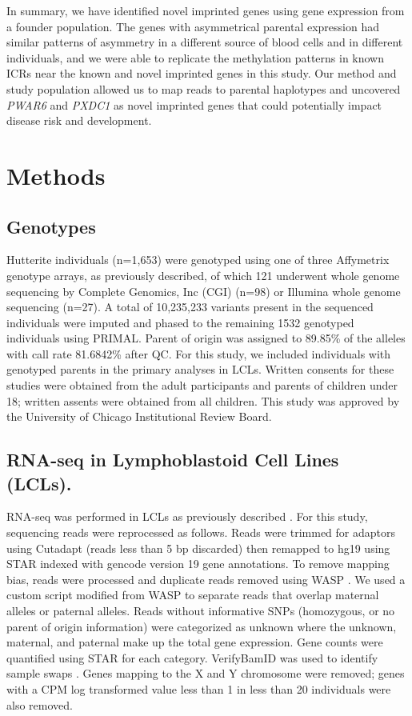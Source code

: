 In summary, we have identified novel imprinted genes using gene expression from a founder population. The genes with asymmetrical parental expression had similar patterns of asymmetry in a different source of blood cells and in different individuals, and we were able to replicate the methylation patterns in known ICRs near the known and novel imprinted genes in this study. Our method and study population allowed us to map reads to parental haplotypes and uncovered \emph{PWAR6} and \emph{PXDC1} as novel imprinted genes that could potentially impact disease risk and development.

\section{Methods}\label{ch03-methods}

\subsection{Genotypes}\label{Genotypes}
Hutterite individuals (n=1,653) were genotyped using one of three Affymetrix genotype arrays, as previously described\citep{Livne2015}, of which 121 underwent whole genome sequencing by Complete Genomics, Inc (CGI) (n=98) or Illumina whole genome sequencing (n=27). A total of 10,235,233 variants present in the sequenced individuals were imputed and phased to the remaining 1532 genotyped individuals using PRIMAL\citep{Livne2015}. Parent of origin was assigned to 89.85\% of the alleles with call rate 81.6842\% after QC. For this study, we included individuals with genotyped parents in the primary analyses in LCLs. Written consents for these studies were obtained from the adult participants and parents of children under 18; written assents were obtained from all children. This study was approved by the University of Chicago Institutional Review Board.   

\subsection{RNA-seq in Lymphoblastoid Cell Lines (LCLs).}\label{RNA-seq in Lymphoblastoid Cell Lines (LCLs).}
RNA-seq was performed in LCLs as previously described \citep{Cusanovich:2016id}. For this study, sequencing reads were reprocessed as follows. Reads were trimmed for adaptors using Cutadapt (reads less than 5 bp discarded) then remapped to hg19 using STAR indexed with gencode version 19 gene annotations\citep{Dobin:2002by, Martin:2011eu}. To remove mapping bias, reads were processed and duplicate reads removed using WASP \citep{vandeGeijn:2015hi}. We used a custom script modified from WASP to separate reads that overlap maternal alleles or paternal alleles. Reads without informative SNPs (homozygous, or no parent of origin information) were categorized as unknown where the unknown, maternal, and paternal make up the total gene expression. Gene counts were quantified using STAR for each category. VerifyBamID was used to identify sample swaps \citep{Jun:2012je}. Genes mapping to the X and Y chromosome were removed; genes with a CPM log transformed value less than 1 in less than 20 individuals were also removed.

